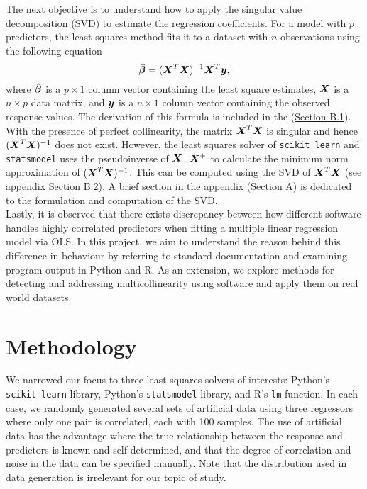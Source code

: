 \documentclass[12pt]{article}
\newcommand{\gbh}{\hat{\gb}}
\begin{document}
	The next objective is to understand how to apply the singular value decomposition (SVD) to estimate the regression coefficients. For a model with $p$ predictors, the least squares method fits it to a dataset with $n$ observations using the following equation
	\begin{equation}
		\boldsymbol{\gbh}=(\bmX^T\bmX)^{-1}\bmX^T\bmy,\label{eq3}
	\end{equation}
	where $\boldsymbol{\gbh}$ is a $p\times 1$ column vector containing the least square estimates, $\boldsymbol{X}$ is a $n\times p$ data matrix, and $\boldsymbol{y}$ is a $n\times 1$ column vector containing the observed response values. The derivation of this formula is included in the (\hyperref[sec:append1]{Section B.1}). With the presence of perfect collinearity, the matrix $\boldsymbol{X}^T\boldsymbol{X}$ is singular and hence $(\boldsymbol{X}^T\boldsymbol{X})^{-1}$ does not exist. However, the least squares solver of \texttt{scikit\_learn} and \texttt{statsmodel} uses the pseudoinverse of $\boldsymbol{X}$, $\boldsymbol{X}^+$ to calculate the minimum norm approximation of $(\boldsymbol{X}^T\boldsymbol{X})^{-1}$. This can be computed using the SVD of $\boldsymbol{X}^T\boldsymbol{X}$ (see appendix \hyperref[sec:append2]{Section B.2}). A brief section in the appendix (\hyperref[sec:svd]{Section A}) is dedicated to the formulation and computation of the SVD.\\
	
	Lastly, it is observed that there exists discrepancy between how different software handles highly correlated predictors when fitting a multiple linear regression model via OLS. In this project, we aim to understand the reason behind this difference in behaviour by referring to standard documentation and examining program output in Python and R. As an extension, we explore methods for detecting and addressing multicollinearity using software and apply them on real world datasets.
	
	\section{Methodology}
	
	We narrowed our focus to three least squares solvers of interests: Python's \texttt{scikit-learn} library, Python's \texttt{statsmodel} library, and R's \texttt{lm} function. In each case, we randomly generated several sets of artificial data using three regressors where only one pair is correlated, each with 100 samples. The use of artificial data has the advantage where the true relationship between the response and predictors is known and self-determined, and that the degree of correlation and noise in the data can be specified manually. Note that the distribution used in data generation is irrelevant for our topic of study.\\
	
\end{document}
